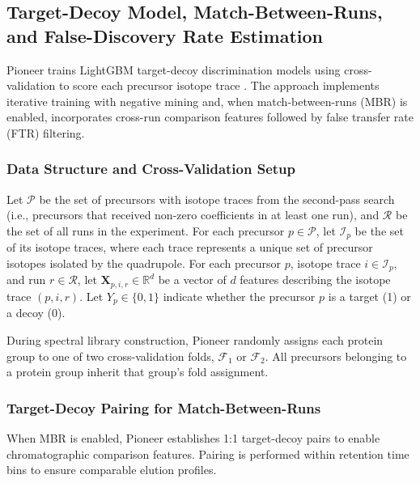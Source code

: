 \documentclass[pdflatex,sn-nature]{sn-jnl}
\begin{document}
\subsection{Target-Decoy Model, Match-Between-Runs, and False-Discovery Rate Estimation}\label{subsec:target-decoy-mbr-fdr}

Pioneer trains LightGBM target-decoy discrimination models using cross-validation to score each precursor isotope trace \cite{LightGBM paper...}. The approach implements iterative training with negative mining and, when match-between-runs (MBR) is enabled, incorporates cross-run comparison features followed by false transfer rate (FTR) filtering.

\subsubsection{Data Structure and Cross-Validation Setup}\label{subsubsec:data-structure-cv-setup}

Let $\mathcal{P}$ be the set of precursors with isotope traces from the second-pass search (i.e., precursors that received non-zero coefficients in at least one run), and $\mathcal{R}$ be the set of all runs in the experiment. For each precursor $p \in \mathcal{P}$, let $\mathcal{I}_p$ be the set of its isotope traces, where each trace represents a unique set of precursor isotopes isolated by the quadrupole. For each precursor $p$, isotope trace $i \in \mathcal{I}_p$, and run $r \in \mathcal{R}$, let $\mathbf{X}_{p,i,r} \in \mathbb{R}^d$ be a vector of $d$ features describing the isotope trace $(p,i,r)$. Let $Y_p \in \{0,1\}$ indicate whether the precursor $p$ is a target (1) or a decoy (0).

During spectral library construction, Pioneer randomly assigns each protein group to one of two cross-validation folds, $\mathcal{F}_1$ or $\mathcal{F}_2$. All precursors belonging to a protein group inherit that group's fold assignment.

\subsubsection{Target-Decoy Pairing for Match-Between-Runs}\label{subsubsec:target-decoy-pairing}

When MBR is enabled, Pioneer establishes 1:1 target-decoy pairs to enable chromatographic comparison features. Pairing is performed within retention time bins to ensure comparable elution profiles.
\end{document}
